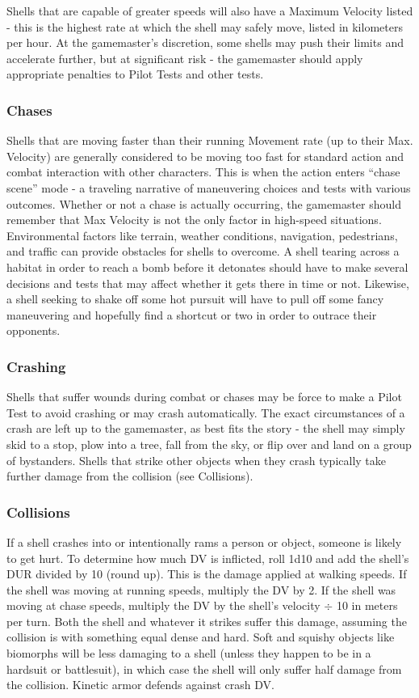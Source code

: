 Shells that are capable of greater speeds will also have a Maximum Velocity listed - this is the highest rate at which the shell may safely move, listed in kilometers per hour. At the gamemaster’s discretion, some shells may push their limits and accelerate further, but at significant risk -  the gamemaster should apply appropriate penalties to Pilot Tests and other tests.

\subsubsection{Chases}
Shells that are moving faster than their running Movement rate (up to their Max. Velocity) are generally considered to be moving too fast for standard action and combat interaction with other characters. This is when the action enters ``chase scene'' mode - a traveling narrative of maneuvering choices and tests with various outcomes. Whether or not a chase is actually occurring, the gamemaster should remember that Max Velocity is not the only factor in high-speed situations. Environmental factors like terrain, weather conditions, navigation, pedestrians, and traffic can provide obstacles for shells to overcome. A shell tearing across a habitat in order to reach a bomb before it detonates should have to make several decisions and tests that may affect whether it gets there in time or not. Likewise, a shell seeking to shake off some hot pursuit will have to pull off some fancy maneuvering and hopefully find a shortcut or two in order to outrace their opponents.

\subsubsection{Crashing}
Shells that suffer wounds during combat or chases may be force to make a Pilot Test to avoid crashing or may crash automatically. The exact circumstances of a crash are left up to the gamemaster, as best fits the story - the shell may simply skid to a stop, plow into a tree, fall from the sky, or flip over and land on a group of bystanders. Shells that strike other objects when they crash typically take further damage from the collision (see Collisions).

\subsubsection{Collisions}
If a shell crashes into or intentionally rams a person or object, someone is likely to get hurt. To determine how much DV is inflicted, roll 1d10 and add the shell’s DUR divided by 10 (round up). This is the damage applied at walking speeds. If the shell was moving at running speeds, multiply the DV by 2. If the shell was moving at chase speeds, multiply the DV by the shell’s velocity $\div$ 10 in meters per turn. Both the shell and whatever it strikes suffer this damage, assuming the collision is with something equal dense and hard. Soft and squishy objects like biomorphs will be less damaging to a shell (unless they happen to be in a hardsuit or battlesuit), in which case the shell will only suffer half damage from the collision. Kinetic armor defends against crash DV.

